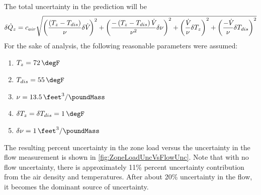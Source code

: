 The total uncertainty in the prediction will be
\begin{equation}
    \delta \dot{Q}_{z} = c_{air} \sqrt{ \left( \frac{\left(T_{z} -
        T_{dis}\right)}{\nu} \delta \dot{V}_{} \right)^2 
    + \left( \frac{- \left(T_{z} - T_{dis}\right) \dot{V}_{}}{\nu^{2}} \delta \nu \right)^{2}  
+ \left( \frac{\dot{V}_{}}{\nu} \delta T_{z}\right)^{2}
+ \left(\frac{-\dot{V}_{}}{\nu} \delta T_{dis}\right)^{2}
}
\end{equation}
For the sake of analysis, the following reasonable parameters were assumed:
\begin{enumerate}
    \item \(T_{z} = \SI{72}{\degF} \)
    \item \(T_{dis} = \SI{55}{\degF} \)
    \item \(\nu = \SI{13.5}{\feet\cubed\per\poundMass}\)
    \item \(\delta T_{z} = \delta T_{dis} = \SI{1}{\degF}\)
    \item \( \delta \nu = \SI{1}{\feet\cubed\per\poundMass} \)
\end{enumerate}

The resulting percent uncertainty in the zone load versus the
uncertainty in the flow measurement is shown in \figref{}
\ref{fig:ZoneLoadUncVsFlowUnc}. Note that with no flow
uncertainty, there is approximately 11\% percent uncertainty
contribution from the air density and temperatures. After about 20\%
uncertainty in the flow, it becomes the dominant source of uncertainty. 



